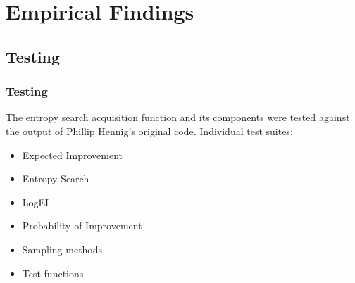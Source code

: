 \documentclass[10pt,handout]{beamer}
\begin{document}
%
%
%






\section{Empirical Findings}

\subsection{Testing}
\begin{frame}
\frametitle{Testing}

The entropy search acquisition function and its components were tested
against the output of Phillip Hennig's original code. Individual test suites:

\begin{itemize}
  \item Expected Improvement
  \item Entropy Search
  \item LogEI
  \item Probability of Improvement
  \item Sampling methods
  \item Test functions
\end{itemize}
\end{frame}
\end{document}
